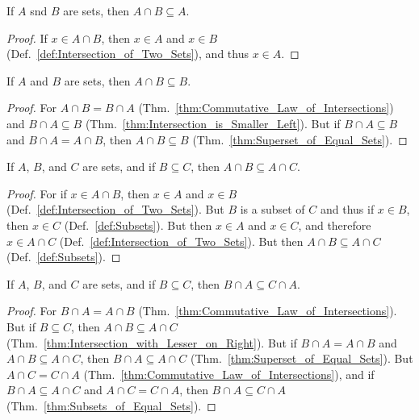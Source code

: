         \begin{theorem}
            \label{thm:Intersection_is_Smaller_Left}%
            If $A$ snd $B$ are sets, then $A\cap{B}\subseteq{A}$.
        \end{theorem}
        \begin{proof}
            If $x\in{A}\cap{B}$, then $x\in{A}$ and $x\in{B}$
            (Def.~\ref{def:Intersection_of_Two_Sets}), and thus $x\in{A}$.
        \end{proof}
        \begin{theorem}
            \label{thm:Intersection_is_Smaller_Right}%
            If $A$ and $B$ are sets, then $A\cap{B}\subseteq{B}$.
        \end{theorem}
        \begin{proof}
            For $A\cap{B}=B\cap{A}$
            (Thm.~\ref{thm:Commutative_Law_of_Intersections}) and
            $B\cap{A}\subseteq{B}$
            (Thm.~\ref{thm:Intersection_is_Smaller_Left}). But if
            $B\cap{A}\subseteq{B}$ and $B\cap{A}=A\cap{B}$, then
            $A\cap{B}\subseteq{B}$ (Thm.~\ref{thm:Superset_of_Equal_Sets}).
        \end{proof}
        \begin{theorem}
            \label{thm:Intersection_with_Lesser_on_Right}%
            If $A$, $B$, and $C$ are sets, and if $B\subseteq{C}$, then
            $A\cap{B}\subseteq{A}\cap{C}$.
        \end{theorem}
        \begin{proof}
            For if $x\in{A}\cap{B}$, then $x\in{A}$ and $x\in{B}$
            (Def.~\ref{def:Intersection_of_Two_Sets}). But $B$ is a subset of
            $C$ and thus if $x\in{B}$, then $x\in{C}$ (Def.~\ref{def:Subsets}).
            But then $x\in{A}$ and $x\in{C}$, and therefore $x\in{A}\cap{C}$
            (Def.~\ref{def:Intersection_of_Two_Sets}). But
            then $A\cap{B}\subseteq{A}\cap{C}$ (Def.~\ref{def:Subsets}).
        \end{proof}
        \begin{theorem}
            \label{thm:Intersection_with_Lesser_on_Left}%
            If $A$, $B$, and $C$ are sets, and if $B\subseteq{C}$, then
            $B\cap{A}\subseteq{C}\cap{A}$.
        \end{theorem}
        \begin{proof}
            For $B\cap{A}=A\cap{B}$
            (Thm.~\ref{thm:Commutative_Law_of_Intersections}). But if
            $B\subseteq{C}$, then $A\cap{B}\subseteq{A}\cap{C}$
            (Thm.~\ref{thm:Intersection_with_Lesser_on_Right}). But if
            $B\cap{A}=A\cap{B}$ and $A\cap{B}\subseteq{A}\cap{C}$, then
            $B\cap{A}\subseteq{A}\cap{C}$
            (Thm.~\ref{thm:Superset_of_Equal_Sets}). But $A\cap{C}=C\cap{A}$
            (Thm.~\ref{thm:Commutative_Law_of_Intersections}), and if
            $B\cap{A}\subseteq{A}\cap{C}$ and $A\cap{C}=C\cap{A}$, then
            $B\cap{A}\subseteq{C}\cap{A}$
            (Thm.~\ref{thm:Subsets_of_Equal_Sets}).
        \end{proof}
